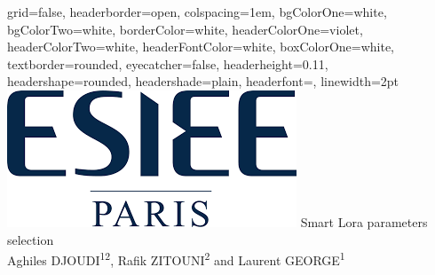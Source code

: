 \documentclass[a0paper,portrait]{baposter}
\newcommand\Mark[1]{\textsuperscript#1}
\begin{document}

\begin{poster}{
    grid=false,
    headerborder=open,           %
    colspacing=1em,              %
    bgColorOne=white,            %
    bgColorTwo=white,            %
    borderColor=white,       %
    headerColorOne=violet,   %
    headerColorTwo=white,   %
    headerFontColor=white,       %
    boxColorOne=white,           %
    textborder=rounded,          %
    eyecatcher=false,            %
    headerheight=0.11\textheight,%
    headershape=rounded,         %
    headershade=plain,
    headerfont=\Large\textsf,    %
    linewidth=2pt                %
}{
    \includegraphics[scale=.3]{logo}
}{
   \textsf{Smart Lora parameters selection}
}{
    \sf\vspace{0.5em}\\
        Aghiles DJOUDI\Mark{1}\Mark{2}, Rafik ZITOUNI\Mark{2} and Laurent GEORGE\Mark{1}
    \vspace{0.1em}\\
}
\end{poster}
\end{document}
